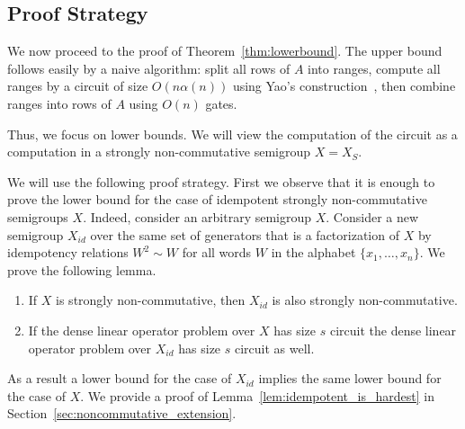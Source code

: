 \documentclass{toc}
\begin{document}
\subsection{Proof Strategy}


We now proceed to the proof of Theorem~\ref{thm:lowerbound}. The upper bound
follows easily by a naive algorithm: split all rows of $A$ into ranges, compute
all ranges by a circuit of size $O(n\alpha(n))$ using Yao's
construction~\cite{DBLP:conf/stoc/Yao82}, then combine ranges into rows of $A$
using $O(n)$ gates.

Thus, we focus on lower bounds. We will view the computation of the circuit as a
computation in a strongly non-commutative semigroup $X=X_S$.

We will use the following proof strategy. First we observe that it is enough to
prove the lower bound for the case of idempotent strongly non-commutative
semigroups $X$. Indeed, 
consider an arbitrary semigroup $X$. Consider a new semigroup $X_{id}$ over the same set of generators that is a factorization of $X$ by idempotency relations $W^2\sim W$ for all words $W$ in the alphabet $\{x_1,\ldots, x_n\}$.
We prove the following lemma.
\begin{lemma} \label{lem:idempotent_is_hardest}
	\begin{enumerate}
		\item If $X$ is strongly non-commutative, then $X_{id}$ is also strongly non-commutative.
		\item If the dense linear operator problem over $X$ has size $s$
		circuit the dense linear operator problem over $X_{id}$ has size
		$s$ circuit as well.
	\end{enumerate}
\end{lemma}
As a result a lower bound for the case of $X_{id}$ implies the same lower bound for the case of $X$. 
We provide a proof of Lemma~\ref{lem:idempotent_is_hardest} in
Section~\ref{sec:noncommutative_extension}.
\end{document}
